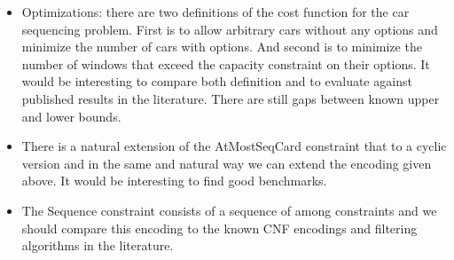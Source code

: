 \documentclass[]{llncs}
\begin{document}
\begin{itemize}
    \item Optimizations: there are two definitions of the cost function
        for the car sequencing problem. First is to allow arbitrary cars
        without any options and minimize the number of cars with
        options. And second is to minimize the number of windows that
        exceed the capacity constraint on their options. It would be
        interesting to compare both definition and to evaluate against
        published results in the literature. There are still gaps
        between known upper and lower bounds. 
    \item There is a natural extension of the AtMostSeqCard constraint
        that to a cyclic version and in the same and natural way we can
        extend the encoding given above. It would be interesting to find
        good benchmarks. 
    \item The Sequence constraint consists of a sequence of among
        constraints and we should compare this encoding to the known CNF
        encodings and filtering algorithms in the literature. 
\end{itemize}
\end{document}
